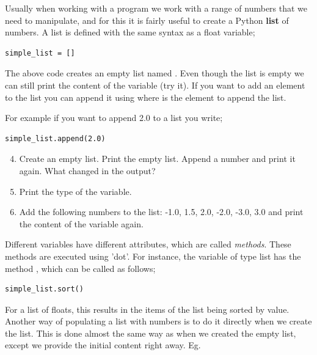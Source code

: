 \documentclass{article}
\begin{document}
Usually when working with a program we work with a range of numbers
that we need to manipulate, and for this it is fairly useful to create a Python {\bf list}
of numbers.
A list is defined with the same syntax as a float variable;

\begin{lstlisting}
simple_list = []
\end{lstlisting}

The above code creates an empty list named .
Even though the list is empty we can still print
the content of the variable (try it).
If you want to add an element to the list you can
append it using  where  is the element to append the list.

For example if you want to append 2.0 to a list you write;

\begin{lstlisting}
simple_list.append(2.0)
\end{lstlisting}

\begin{enumerate}
  \setcounter{enumi}{3}
  \item Create an empty list.
    Print the empty list.
    Append a number and print it again.
    What changed in the output?

  \item Print the type of the variable.

  \item Add the following numbers to the list: -1.0, 1.5, 2.0, -2.0, -3.0, 3.0 and
    print the content of the variable again.
\end{enumerate}


Different variables have different attributes, which are called {\em methods}.
These methods are executed using 'dot'.
For instance,
the variable of type list has the method ,
which can be called as follows;

\begin{lstlisting}
simple_list.sort()
\end{lstlisting}

For a list of floats, this results in the items of the list being sorted by value.\\

Another way of populating a list with numbers is to do it directly when
we create the list.
This is done almost the same way as when we created the empty list, except we
provide the initial content right away. Eg.
\end{document}
